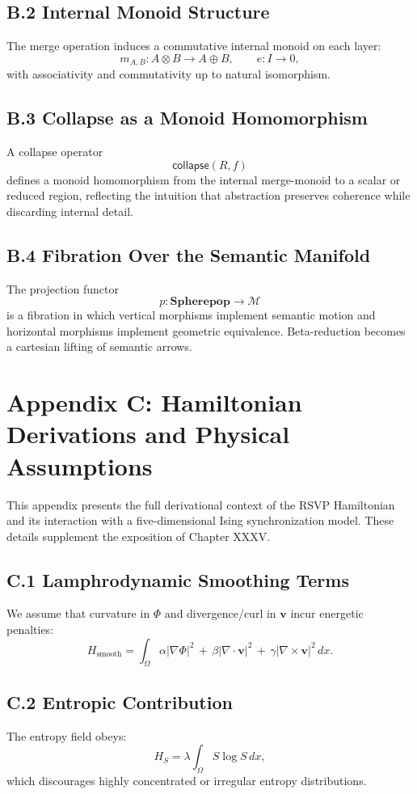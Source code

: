 \documentclass[12pt,letterpaper]{article}
\begin{document}
\subsection*{B.2 Internal Monoid Structure}
The merge operation induces a commutative internal monoid on each layer:
\[
m_{A,B} : A \otimes B \to A \oplus B,
\qquad
e : I \to 0,
\]
with associativity and commutativity up to natural isomorphism.

\subsection*{B.3 Collapse as a Monoid Homomorphism}
A collapse operator
\[
\mathsf{collapse}(R,f)
\]
defines a monoid homomorphism from the internal merge-monoid to a scalar or
reduced region, reflecting the intuition that abstraction preserves coherence
while discarding internal detail.

\subsection*{B.4 Fibration Over the Semantic Manifold}
The projection functor
\[
p : \mathbf{Spherepop} \to \mathcal{M}
\]
is a fibration in which vertical morphisms implement semantic motion and
horizontal morphisms implement geometric equivalence.  Beta-reduction becomes a
cartesian lifting of semantic arrows.


\section{Appendix C: Hamiltonian Derivations and Physical Assumptions}

This appendix presents the full derivational context of the RSVP Hamiltonian and
its interaction with a five-dimensional Ising synchronization model.  These
details supplement the exposition of Chapter XXXV.

\subsection*{C.1 Lamphrodynamic Smoothing Terms}
We assume that curvature in $\Phi$ and divergence/curl in $\mathbf{v}$ incur
energetic penalties:
\[
H_{\text{smooth}}
=
\int_{\Omega}
\alpha |\nabla\Phi|^2
\,+\,
\beta|\nabla\cdot\mathbf{v}|^2
\,+\,
\gamma|\nabla\times\mathbf{v}|^2
\,dx.
\]

\subsection*{C.2 Entropic Contribution}
The entropy field obeys:
\[
H_S
=
\lambda\int_{\Omega} S\log S \, dx,
\]
which discourages highly concentrated or irregular entropy distributions.
\end{document}
